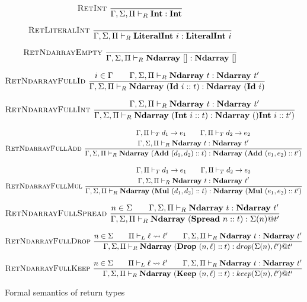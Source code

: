 \documentclass[12pt]{report}
\begin{document}
\begin{figure}
    {\small
    $$\textsc{RetInt}~\frac{}{\Gamma, \Sigma, \Pi \vdash_R \textbf{Int} : \textbf{Int}}$$

    $$\textsc{RetLiteralInt}~\frac{}{\Gamma, \Sigma, \Pi \vdash_R \textbf{LiteralInt}~i : \textbf{LiteralInt}~i}$$

    $$\textsc{RetNdarrayEmpty}~\frac{}{\Gamma, \Sigma, \Pi \vdash_R \textbf{Ndarray}~[] : \textbf{Ndarray}~[]}$$

    $$\textsc{RetNdarrayFullId}~\frac{i \in \Gamma \qquad \Gamma, \Sigma, \Pi \vdash_R \textbf{Ndarray}~t : \textbf{Ndarray}~t'}{\Gamma, \Sigma, \Pi \vdash_R \textbf{Ndarray}~(\textbf{Id}~i :: t) : \textbf{Ndarray}~(\textbf{Id}~i)}$$

    $$\textsc{RetNdarrayFullInt}~\frac{\Gamma, \Sigma, \Pi \vdash_R \textbf{Ndarray}~t : \textbf{Ndarray}~t'}{\Gamma, \Sigma, \Pi \vdash_R \textbf{Ndarray}~(\textbf{Int}~i :: t) : \textbf{Ndarray}~()\textbf{Int}~i :: t')}$$

    $$\textsc{RetNdarrayFullAdd}~\frac{\begin{gathered}\Gamma, \Pi \vdash_T d_1 \rightarrow e_1 \qquad \Gamma, \Pi \vdash_T d_2 \rightarrow e_2 \\ \Gamma, \Sigma, \Pi \vdash_R \textbf{Ndarray}~t : \textbf{Ndarray}~t'\end{gathered}}{\Gamma, \Sigma, \Pi \vdash_R \textbf{Ndarray}~(\textbf{Add}~(d_1, d_2) :: t) : \textbf{Ndarray}~(\textbf{Add}~(e_1, e_2) :: t')}$$

    $$\textsc{RetNdarrayFullMul}~\frac{\begin{gathered}\Gamma, \Pi \vdash_T d_1 \rightarrow e_1 \qquad \Gamma, \Pi \vdash_T d_2 \rightarrow e_2 \\ \Gamma, \Sigma, \Pi \vdash_R \textbf{Ndarray}~t : \textbf{Ndarray}~t'\end{gathered}}{\Gamma, \Sigma, \Pi \vdash_R \textbf{Ndarray}~(\textbf{Mul}~(d_1, d_2) :: t) : \textbf{Ndarray}~(\textbf{Mul}~(e_1, e_2) :: t')}$$

    $$\textsc{RetNdarrayFullSpread}~\frac{n \in \Sigma \qquad \Gamma, \Sigma, \Pi \vdash_R \textbf{Ndarray}~t : \textbf{Ndarray}~t'}{\Gamma, \Sigma, \Pi \vdash_R \textbf{Ndarray}~(\textbf{Spread}~n :: t) : \Sigma(n) @ t'}$$

    $$\textsc{RetNdarrayFullDrop}~\frac{n \in \Sigma \qquad \Pi \vdash_L \ell \rightsquigarrow \ell' \qquad \Gamma, \Sigma, \Pi \vdash_R \textbf{Ndarray}~t : \textbf{Ndarray}~t'}{\Gamma, \Sigma, \Pi \vdash_R \textbf{Ndarray}~(\textbf{Drop}~(n, \ell) :: t) : drop(\Sigma(n), \ell') @ t'}$$

    $$\textsc{RetNdarrayFullKeep}~\frac{n \in \Sigma \qquad \Pi \vdash_L \ell \rightsquigarrow \ell' \qquad \Gamma, \Sigma, \Pi \vdash_R \textbf{Ndarray}~t : \textbf{Ndarray}~t'}{\Gamma, \Sigma, \Pi \vdash_R \textbf{Ndarray}~(\textbf{Keep}~(n, \ell) :: t) : keep(\Sigma(n), \ell') @ t'}$$
    \caption{Formal semantics of return types}
    \label{semantics:ret}}
\end{figure}
\end{document}
